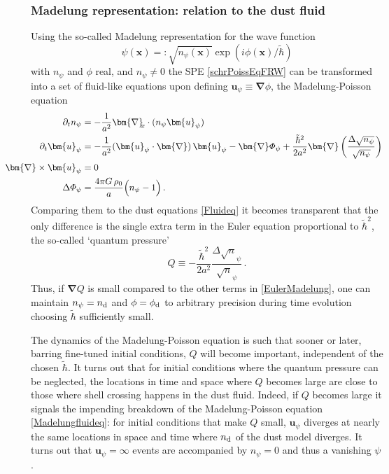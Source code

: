 \documentclass[twocolumn, nofootinbib, showpacs, superscriptaddress]{revtex4-1}
\newcommand{\thbar}{\tilde\hbar}
\renewcommand{\d}[0]{{\rm{d}}}
\newcommand{\del}[0]{\partial }
\newcommand{\vx}[0]{\bm{x} }
\newcommand{\vu}[0]{\bm{u} }
\newcommand{\vnabla}[0]{\bm{\nabla} }
\newcommand{\npsi}{n_\psi}
\newcommand{\vupsi}{\vu_\psi}
\begin{document}
\subsubsection{Madelung representation: relation to the dust fluid}
\label{subsec:Madelung}
Using the so-called Madelung representation for the wave function 
\begin{equation}
\psi(\vx)=: \sqrt{\npsi(\vx)}\exp\left(i\phi(\vx)/\thbar\right)
\end{equation}
with $\npsi$ and $\phi$ real, and $n_\psi\neq 0$ the SPE \eqref{schrPoissEqFRW} can be transformed  into a set of fluid-like equations upon defining $\vupsi\equiv\vnabla \phi$, the Madelung-Poisson equation \cite{M27}
\begin{subequations} \label{Madelungfluideq}
\begin{align}
\del_t \npsi &= -\frac{1}{a^2}\vnabla_{\! \!  x}\cdot (\npsi\vu_
\psi) \\
 \del_t \vupsi &= -\frac{1}{a^2}(\vupsi\cdot\vnabla)\,\vupsi -\vnabla \varPhi_\psi +\frac{\thbar^2}{2a^2} \vnabla \left( \frac{\Delta\sqrt{\npsi}}{\sqrt{\npsi}} \right) \label{EulerMadelung} \\
  \hspace{-1cm} \vnabla \times \vupsi & = 0  \\
  \Delta \varPhi_\psi&=\frac{4\pi G\,\rho_0}{a}\Big(\npsi -  1 \Big) \label{Poisspsi}\,.
\end{align}
\end{subequations}
Comparing them to the dust equations \eqref{Fluideq} it becomes transparent that the only difference is the single extra term in the Euler equation proportional to $\thbar^2$, the so-called `quantum pressure' 
\begin{equation} \label{Qdef}
Q\equiv - \frac{\thbar^2}{2a^2} \frac{\Delta\sqrt \npsi}{\sqrt \npsi}\,.
\end{equation}
Thus, if  $\vnabla Q$ is small compared to the other terms in \eqref{EulerMadelung}, one can maintain  $\npsi = n_\d$ and $\phi = \phi_\d$  to arbitrary precision during time evolution choosing $\thbar$ sufficiently small.

 The dynamics of the Madelung-Poisson equation is such that sooner or later, barring fine-tuned initial conditions, $Q$ will become important, 
independent of the chosen $\thbar$.
 It turns out that for initial conditions where the quantum pressure can be neglected, the locations in time and space 
where $Q$ becomes large are close to those where shell crossing happens in the dust fluid.
Indeed, if $Q$ becomes large it signals the impending breakdown of the Madelung-Poisson equation \eqref{Madelungfluideq}:
for initial conditions that make $Q$ small, $\vu_\psi$ diverges at nearly the same locations in space and time where $n_\d$ of the dust model diverges.
 It turns out that $\vu_\psi = \infty$ events are accompanied by $\npsi=0$ and thus a vanishing $\psi$. 
\end{document}
